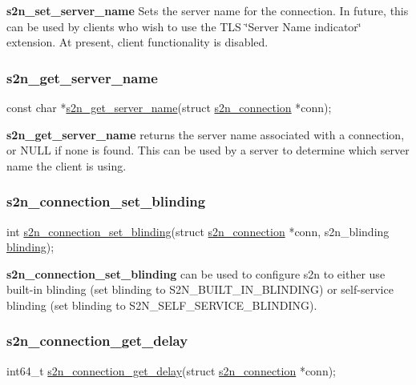 {\bfseries s2n\+\_\+set\+\_\+server\+\_\+name} Sets the server name for the connection. In future, this can be used by clients who wish to use the T\+LS \char`\"{}\+Server Name indicator\char`\"{} extension. At present, client functionality is disabled.

\subsubsection*{s2n\+\_\+get\+\_\+server\+\_\+name}


\begin{DoxyCode}
\textcolor{keyword}{const} \textcolor{keywordtype}{char} *\hyperlink{s2n_8h_a541a5e22fc8b6295e4c6bb1692cdd850}{s2n\_get\_server\_name}(\textcolor{keyword}{struct} \hyperlink{structs2n__connection}{s2n\_connection} *conn);
\end{DoxyCode}


{\bfseries s2n\+\_\+get\+\_\+server\+\_\+name} returns the server name associated with a connection, or N\+U\+LL if none is found. This can be used by a server to determine which server name the client is using.

\subsubsection*{s2n\+\_\+connection\+\_\+set\+\_\+blinding}


\begin{DoxyCode}
\textcolor{keywordtype}{int} \hyperlink{s2n_8h_a7b2423a701b89f7ca3a4de550c519d35}{s2n\_connection\_set\_blinding}(\textcolor{keyword}{struct} \hyperlink{structs2n__connection}{s2n\_connection} *conn, 
      s2n\_blinding \hyperlink{structs2n__connection_a1bfa8f7b48f1d0d742fed4a18b4d3f40}{blinding});
\end{DoxyCode}


{\bfseries s2n\+\_\+connection\+\_\+set\+\_\+blinding} can be used to configure s2n to either use built-\/in blinding (set blinding to S2\+N\+\_\+\+B\+U\+I\+L\+T\+\_\+\+I\+N\+\_\+\+B\+L\+I\+N\+D\+I\+NG) or self-\/service blinding (set blinding to S2\+N\+\_\+\+S\+E\+L\+F\+\_\+\+S\+E\+R\+V\+I\+C\+E\+\_\+\+B\+L\+I\+N\+D\+I\+NG).

\subsubsection*{s2n\+\_\+connection\+\_\+get\+\_\+delay}


\begin{DoxyCode}
int64\_t \hyperlink{s2n_8h_aebf38ba3c1ebd08e7fdd185d8f3ec521}{s2n\_connection\_get\_delay}(\textcolor{keyword}{struct} \hyperlink{structs2n__connection}{s2n\_connection} *conn);
\end{DoxyCode}


